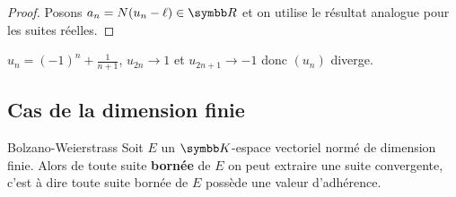 \begin{proof}
    Posons $a_n = N(u_n - \ell) \in \R$ et on utilise le résultat analogue pour les suites réelles.
\end{proof}

\begin{exemple}
    $u_n = (-1)^n + \frac 1 {n+1}$, $u_{2n} \to 1$ et $u_{2n + 1} \to -1$ donc $(u_n)$ diverge.
\end{exemple}

\subsection{Cas de la dimension finie}
\begin{theoreme}{Bolzano-Weierstrass}{}
    Soit $E$ un $\K$-espace vectoriel normé de dimension finie. Alors de toute suite
    \textbf{bornée} de $E$ on peut extraire une suite convergente, c'est à dire toute 
    suite bornée de $E$ possède une valeur d'adhérence. 
\end{theoreme}


